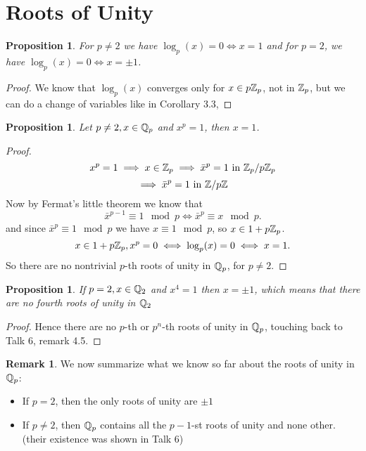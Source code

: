 \documentclass[a4paper]{article}
\theoremstyle{plain}
\newtheorem{prop}[thm]{Proposition}
\theoremstyle{definition}
\newtheorem{rem}[thm]{Remark}
\begin{document}
\section{Roots of Unity}
\begin{prop}
  For $p \neq 2$ we have $\log_{p}(x)=0 \iff x=1$ and for $p = 2$, we have $\log_{p}(x)=0 \iff x= \pm 1$.
\end{prop}
\begin{proof}
  We know that $\log_{p}(x)$ converges only for $x \in p\Bbb Z_{p}$, not in $\Bbb Z_{p}$, but we can do a change of variables like in Corollary 3.3,

\end{proof}
\begin{prop}
  Let $p \neq 2, x \in \Bbb Q_{p}$ and $x^{p}=1$, then $x=1$.
\end{prop}
\begin{proof}
  $$x^{p} = 1 \implies x \in \Bbb Z_{p} \implies \bar x^{p} = 1 \text{ in } \Bbb Z_{p}/p\Bbb Z_{p}$$
  $$\implies \bar x^{p} = 1 \text{ in } \Bbb Z/p\Bbb Z$$
  Now by Fermat's little theorem we know that
  $$\bar x^{p-1} \equiv 1 \mod p \iff \bar x^{p} \equiv x \mod p.$$
  and since $\bar x^{p} \equiv 1 \mod p$ we have $x \equiv 1 \mod p$, so $x \in 1+p\Bbb Z_{p}$.
  $$x \in 1+p\Bbb Z_{p}, x^{p} = 0 \iff \log_{p}(x) = 0 \iff x = 1.$$
  So there are no nontrivial $p$-th roots of unity in $\Bbb Q_{p}$, for $p \neq 2$.
\end{proof}
\begin{prop} If $p = 2, x \in \Bbb Q_{2}$ and $x^{4} = 1$ then $x = \pm 1$, which means that there are no fourth roots of unity in $\Bbb Q_{2}$
\end{prop}
\begin{proof}
  Hence there are no $p$-th or $p^{n}$-th roots of unity in $\Bbb Q_{p}$, touching back to Talk 6, remark 4.5.
\end{proof}
\begin{rem}
  We now summarize what we know so far about the roots of unity in $\Bbb Q_{p}$:
  \begin{itemize}
    \item If $p=2$, then the only roots of unity are $\pm 1$
    \item If $p \neq 2$, then $\Bbb Q_{p}$ contains all the $p-1$-st roots of unity and none other. (their existence was shown in Talk 6)
  \end{itemize}

\end{rem}
\end{document}
